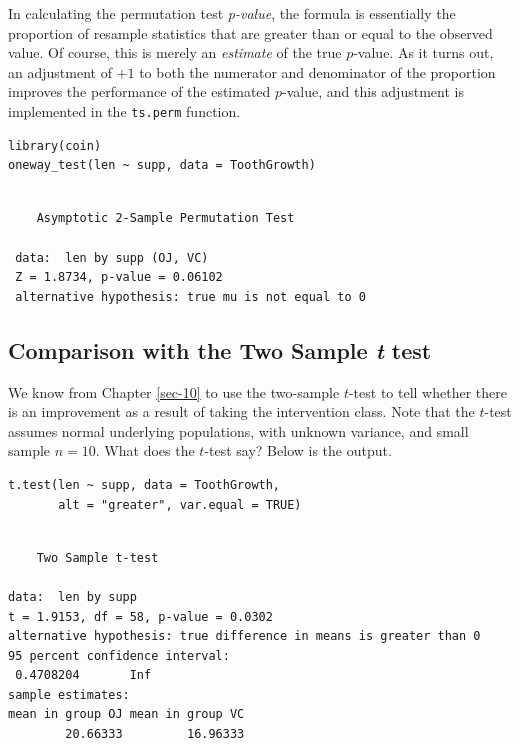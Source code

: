 \documentclass[captions=tableheading]{scrbook}
\begin{document}
\begin{example}
\begin{rem}
In calculating the permutation test \emph{p-value}, the formula is essentially the proportion of resample statistics that are greater than or equal to the observed value. Of course, this is merely an \emph{estimate} of the true \(p\)-value. As it turns out, an adjustment of \(+1\) to both the numerator and denominator of the proportion improves the performance of the estimated \(p\)-value, and this adjustment is implemented in the \texttt{ts.perm} function.
\end{rem}


\lstset{language=R}
\begin{lstlisting}
library(coin)
oneway_test(len ~ supp, data = ToothGrowth)
\end{lstlisting}

\begin{verbatim}
 
 	Asymptotic 2-Sample Permutation Test
 
 data:  len by supp (OJ, VC) 
 Z = 1.8734, p-value = 0.06102
 alternative hypothesis: true mu is not equal to 0
\end{verbatim}
\subsection{Comparison with the Two Sample \emph{t} test}
\label{sec-13-4-2}


We know from Chapter \ref{sec-10} to use the two-sample \(t\)-test to tell whether there is an improvement as a result of taking the intervention class. Note that the \(t\)-test assumes normal underlying populations, with unknown variance, and small sample \(n=10\). What does the \(t\)-test say? Below is the output. 


\lstset{language=R}
\begin{lstlisting}
t.test(len ~ supp, data = ToothGrowth, 
       alt = "greater", var.equal = TRUE)
\end{lstlisting}


\begin{verbatim}

	Two Sample t-test

data:  len by supp 
t = 1.9153, df = 58, p-value = 0.0302
alternative hypothesis: true difference in means is greater than 0 
95 percent confidence interval:
 0.4708204       Inf 
sample estimates:
mean in group OJ mean in group VC 
        20.66333         16.96333
\end{verbatim}




\end{example}
\end{document}
